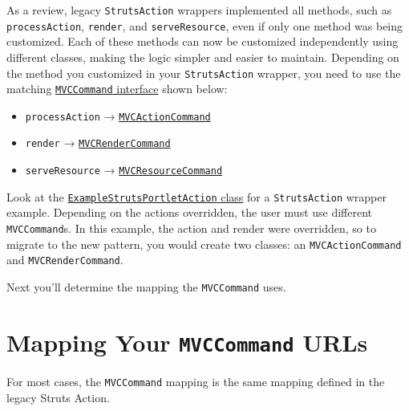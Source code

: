 As a review, legacy \texttt{StrutsAction} wrappers implemented all
methods, such as \texttt{processAction}, \texttt{render}, and
\texttt{serveResource}, even if only one method was being customized.
Each of these methods can now be customized independently using
different classes, making the logic simpler and easier to maintain.
Depending on the method you customized in your \texttt{StrutsAction}
wrapper, you need to use the matching
\href{https://docs.liferay.com/dxp/portal/7.2-latest/javadocs/portal-kernel/com/liferay/portal/kernel/portlet/bridges/mvc/MVCCommand.html}{\texttt{MVCCommand}
interface} shown below:

\begin{itemize}
\tightlist
\item
  \texttt{processAction} →
  \href{https://docs.liferay.com/dxp/portal/7.2-latest/javadocs/portal-kernel/com/liferay/portal/kernel/portlet/bridges/mvc/MVCActionCommand.html}{\texttt{MVCActionCommand}}
\item
  \texttt{render} →
  \href{https://docs.liferay.com/dxp/portal/7.2-latest/javadocs/portal-kernel/com/liferay/portal/kernel/portlet/bridges/mvc/MVCRenderCommand.html}{\texttt{MVCRenderCommand}}
\item
  \texttt{serveResource} →
  \href{https://docs.liferay.com/dxp/portal/7.2-latest/javadocs/portal-kernel/com/liferay/portal/kernel/portlet/bridges/mvc/MVCResourceCommand.html}{\texttt{MVCResourceCommand}}
\end{itemize}

Look at the
\href{/docs/6-2/tutorials/-/knowledge_base/t/overriding-and-adding-struts-actions}{\texttt{ExampleStrutsPortletAction}
class} for a \texttt{StrutsAction} wrapper example. Depending on the
actions overridden, the user must use different \texttt{MVCCommand}s. In
this example, the action and render were overridden, so to migrate to
the new pattern, you would create two classes: an
\texttt{MVCActionCommand} and \texttt{MVCRenderCommand}.

Next you'll determine the mapping the \texttt{MVCCommand} uses.

\section{\texorpdfstring{Mapping Your \texttt{MVCCommand}
URLs}{Mapping Your MVCCommand URLs}}\label{mapping-your-mvccommand-urls}

For most cases, the \texttt{MVCCommand} mapping is the same mapping
defined in the legacy Struts Action.

